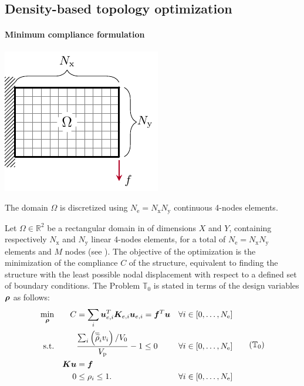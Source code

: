 \subsection{Density-based topology optimization}

\paragraph{Minimum compliance formulation}
\begin{marginfigure}
    \centering
    \includegraphics{figures/02_literature/01_contin_mesh/c_mesh.pdf}
    \caption{The domain $\Omega$ is discretized using $N_\text{e}=N_\text{x} N_\text{y}$ continuous 4-nodes elements.}
    \label{fig:02_mesh_c}
\end{marginfigure}
Let $\Omega \in \mathbb{R}^2$ be a rectangular domain in of dimensions $X$ and $Y$, containing respectively $N_\text{x}$ and $N_\text{y}$ linear 4-nodes elements, for a total of $N_\text{e}=N_\text{x} N_\text{y}$ elements and $M$ nodes (see ). The objective of the optimization is the minimization of the compliance $C$ of the structure, equivalent to finding the structure with the least possible nodal displacement with respect to a defined set of boundary conditions. The Problem $\mathbb{T}_0$ is stated in terms of the design variables $\bm{\rho}$ as follows:
\begin{equation}
    \begin{aligned}
    \min_{\vect{\rho}}         && C &= \sum_{i} \vect{u}_{e,i}^T \matr{K}_{e,i} \vect{u}_{e,i}=\vect{f}^T\vect{u}&& \forall i \in [0,\dots,N_\text{e}]                         \\
    \textrm{s.t.}   && & \frac{\sum_{i} \left(\rhophys_i v_i \right) / V_0}{V_\text{p}} - 1 \leq 0 && \forall i \in [0,\dots,N_\text{e}] \\
    && \matr{K}\vect{u} &= \vect{f} &&\\
    && 0 &\leq \rho_i \leq 1. && \forall i \in [0,\dots,N_\text{e}] \\
    \end{aligned}
    \tag{$\mathbb{T}_0$}
    \label{eq:02_prob-comp}
\end{equation}
